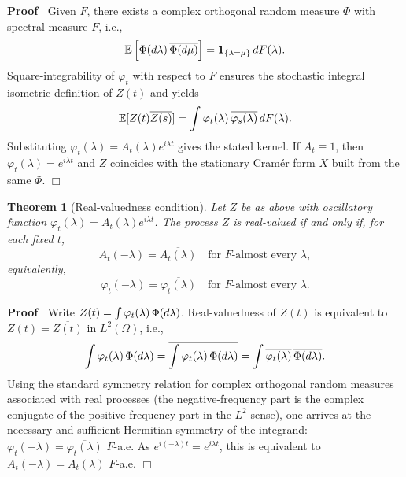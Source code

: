 \documentclass{article}
\newenvironment{proof}{\noindent\textbf{Proof\ }}{\hspace*{\fill}$\Box$\medskip}
\newtheorem{theorem}{Theorem}
\begin{document}
\begin{proof}
  Given $F$, there exists a complex orthogonal random measure $\Phi$ with
  spectral measure $F$, i.e.,
  \[ \mathbb{E} \left[ \Phi (d \lambda) \hspace{0.17em} \overline{\Phi (d
     \mu)} \right] = \textbf{1}_{\{\lambda = \mu\}}  \hspace{0.17em} dF
     (\lambda) . \]
  Square-integrability of $\varphi_t$ with respect to $F$ ensures the
  stochastic integral isometric definition of $Z (t)$ and yields
  \[ \mathbb{E} [Z (t) \overline{Z (s)}] = \int \varphi_t (\lambda)
     \hspace{0.17em} \overline{\varphi_s (\lambda)} \hspace{0.17em} dF
     (\lambda) . \]
  Substituting $\varphi_t (\lambda) = A_t (\lambda) e^{i \lambda t}$ gives the
  stated kernel. If $A_t \equiv 1$, then $\varphi_t (\lambda) = e^{i \lambda
  t}$ and $Z$ coincides with the stationary Cram{\'e}r form $X$ built from the
  same $\Phi$.
\end{proof}

\begin{theorem}
  [Real-valuedness condition] Let $Z$ be as above with oscillatory function
  $\varphi_t (\lambda) = A_t (\lambda) e^{i \lambda t}$. The process $Z$ is
  real-valued if and only if, for each fixed $t$,
  \[ A_t  (- \lambda) = \overline{A_t (\lambda)} \quad \text{for } F
     \text{-almost every } \lambda, \]
  equivalently,
  \[ \varphi_t  (- \lambda) = \overline{\varphi_t (\lambda)} \quad \text{for }
     F \text{-almost every } \lambda . \]
\end{theorem}

\begin{proof}
  Write $Z (t) = \int \varphi_t (\lambda)  \hspace{0.17em} \Phi (d \lambda)$.
  Real-valuedness of $Z (t)$ is equivalent to $Z (t) = \overline{Z (t)}$ in
  $L^2 (\Omega)$, i.e.,
  \[ \int \varphi_t (\lambda)  \hspace{0.17em} \Phi (d \lambda) =
     \overline{\int \varphi_t (\lambda)  \hspace{0.17em} \Phi (d \lambda)} =
     \int \overline{\varphi_t (\lambda)} \hspace{0.17em} \overline{\Phi (d
     \lambda)} . \]
  Using the standard symmetry relation for complex orthogonal random measures
  associated with real processes (the negative-frequency part is the complex
  conjugate of the positive-frequency part in the $L^2$ sense), one arrives at
  the necessary and sufficient Hermitian symmetry of the integrand: $\varphi_t
  (- \lambda) = \overline{\varphi_t (\lambda)}$ $F$-a.e. As $e^{i (- \lambda)
  t} = \overline{e^{i \lambda t}}$, this is equivalent to $A_t  (- \lambda) =
  \overline{A_t (\lambda)}$ $F$-a.e.
\end{proof}
\end{document}
